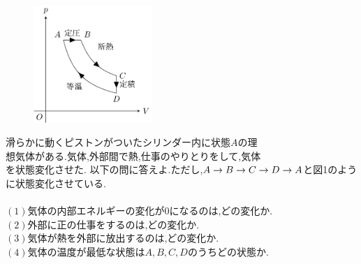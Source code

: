 \documentclass[tikz,dvipdfmx]{jsarticle}
\begin{document}
\begin{figure}
  \centering
  \includegraphics[keepaspectratio,width=45mm]{./req.png}
  \caption{}
  \label{graph}
\end{figure}

滑らかに動くピストンがついたシリンダー内に状態$A$の理\\
想気体がある.気体,外部間で熱,仕事のやりとりをして,気体\\
を状態変化させた.
以下の問に答えよ.ただし,$A \rightarrow B \rightarrow C \rightarrow \\
D \rightarrow A$と図1のように状態変化させている.\\ \\
$(1)$気体の内部エネルギーの変化が$0$になるのは,どの変化か.\\
$(2)$外部に正の仕事をするのは,どの変化か.\\
$(3)$気体が熱を外部に放出するのは,どの変化か.\\
$(4)$気体の温度が最低な状態は$A,B,C,D$のうちどの状態か.\\
\end{document}

